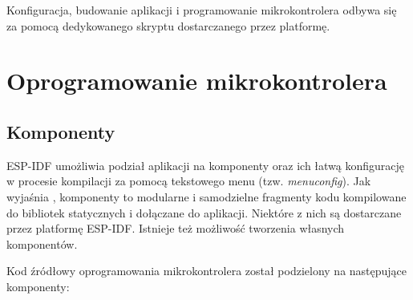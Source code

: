         Konfiguracja, budowanie aplikacji i programowanie mikrokontrolera odbywa się za pomocą dedykowanego skryptu dostarczanego przez platformę.

    \section{Oprogramowanie mikrokontrolera}

        \subsection{Komponenty}

            ESP-IDF umożliwia podział aplikacji na komponenty oraz ich łatwą konfigurację w procesie kompilacji za pomocą tekstowego menu (tzw. \textit{menuconfig}). Jak wyjaśnia \cite{esp-idf-build-system}, komponenty to modularne i samodzielne fragmenty kodu kompilowane do bibliotek statycznych i dołączane do aplikacji. Niektóre z nich są dostarczane przez platformę ESP-IDF. Istnieje też możliwość tworzenia własnych komponentów.

            Kod źródłowy oprogramowania mikrokontrolera został podzielony na następujące komponenty:

